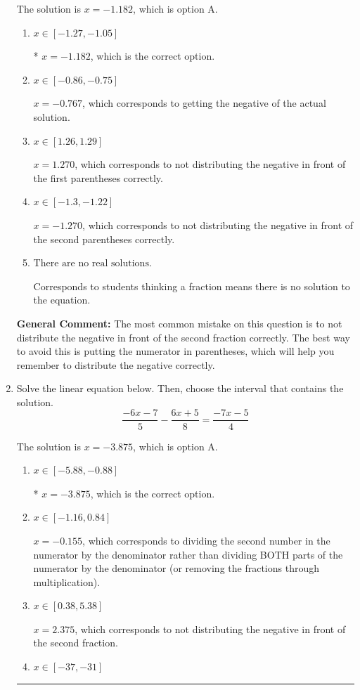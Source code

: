 \documentclass{extbook}[14pt]
\newcommand{\litem}[1]{\item #1

\rule{\textwidth}{0.4pt}}
\begin{document}
\begin{enumerate}
{The solution is \( x = -1.182 \), which is option A.\begin{enumerate}[label=\Alph*.]
\item \( x \in [-1.27, -1.05] \)

* $x = -1.182$, which is the correct option.
\item \( x \in [-0.86, -0.75] \)

$x = -0.767$, which corresponds to getting the negative of the actual solution.
\item \( x \in [1.26, 1.29] \)

$x = 1.270$, which corresponds to not distributing the negative in front of the first parentheses correctly.
\item \( x \in [-1.3, -1.22] \)

$x = -1.270$, which corresponds to not distributing the negative in front of the second parentheses correctly.
\item \( \text{There are no real solutions.} \)

Corresponds to students thinking a fraction means there is no solution to the equation.
\end{enumerate}

\textbf{General Comment:} The most common mistake on this question is to not distribute the negative in front of the second fraction correctly. The best way to avoid this is putting the numerator in parentheses, which will help you remember to distribute the negative correctly.
}
\litem{
Solve the linear equation below. Then, choose the interval that contains the solution.
\[ \frac{-6x -7}{5} - \frac{6x + 5}{8} = \frac{-7x -5}{4} \]

The solution is \( x = -3.875 \), which is option A.\begin{enumerate}[label=\Alph*.]
\item \( x \in [-5.88, -0.88] \)

* $x = -3.875$, which is the correct option.
\item \( x \in [-1.16, 0.84] \)

 $x = -0.155$, which corresponds to dividing the second number in the numerator by the denominator rather than dividing BOTH parts of the numerator by the denominator (or removing the fractions through multiplication).
\item \( x \in [0.38, 5.38] \)

 $x = 2.375$, which corresponds to not distributing the negative in front of the second fraction.
\item \( x \in [-37, -31] \)


\end{enumerate}}
\end{enumerate}
\end{document}
